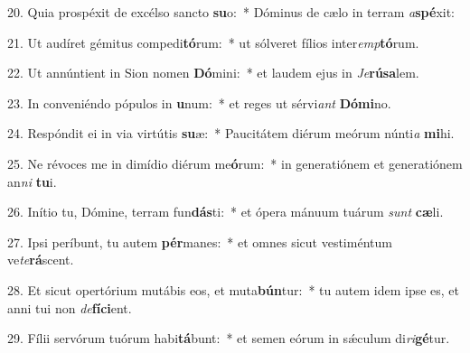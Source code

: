20. Quia prospéxit de excélso sancto \textbf{su}o:~*  Dóminus de cælo in terram \textit{a}\textbf{spé}xit:\

21. Ut audíret gémitus compedi\textbf{tó}rum:~*  ut sólveret fílios inter\textit{emp}\textbf{tó}rum.\

22. Ut annúntient in Sion nomen \textbf{Dó}mini:~*  et laudem ejus in \textit{Je}\textbf{rú}\textbf{sa}lem.\

23. In conveniéndo pópulos in \textbf{u}num:~*  et reges ut sérvi\textit{ant} \textbf{Dó}\textbf{mi}no.\

24. Respóndit ei in via virtútis \textbf{su}æ:~*  Paucitátem diérum meórum núnti\textit{a} \textbf{mi}hi.\

25. Ne révoces me in dimídio diérum me\textbf{ó}rum:~*  in generatiónem et generatiónem an\textit{ni} \textbf{tu}i.\

26. Inítio tu, Dómine, terram fun\textbf{dás}ti:~*  et ópera mánuum tuárum \textit{sunt} \textbf{cæ}li.\

27. Ipsi períbunt, tu autem \textbf{pér}manes:~*  et omnes sicut vestiméntum ve\textit{te}\textbf{rá}scent.\

28. Et sicut opertórium mutábis eos, et muta\textbf{bún}tur:~*  tu autem idem ipse es, et anni tui non \textit{de}\textbf{fí}\textbf{ci}ent.\

29. Fílii servórum tuórum habi\textbf{tá}bunt:~*  et semen eórum in sǽculum di\textit{ri}\textbf{gé}tur.\

